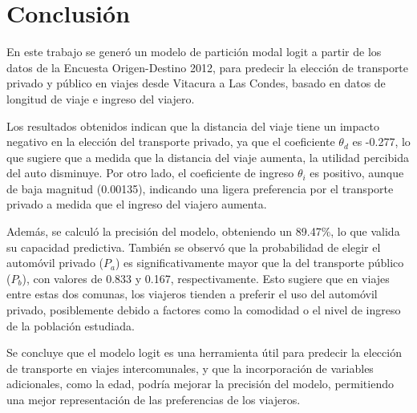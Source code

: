 \section{Conclusión}

En este trabajo se generó un modelo de partición modal logit a partir de los datos de la Encuesta Origen-Destino 2012, para predecir la elección de transporte privado y público en viajes desde Vitacura a Las Condes, basado en datos de longitud de viaje e ingreso del viajero.

Los resultados obtenidos indican que la distancia del viaje tiene un impacto negativo en la elección del transporte privado, ya que el coeficiente $\theta_d$ es -0.277, lo que sugiere que a medida que la distancia del viaje aumenta, la utilidad percibida del auto disminuye. Por otro lado, el coeficiente de ingreso $\theta_i$ es positivo, aunque de baja magnitud (0.00135), indicando una ligera preferencia por el transporte privado a medida que el ingreso del viajero aumenta.

Además, se calculó la precisión del modelo, obteniendo un 89.47\%, lo que valida su capacidad predictiva. También se observó que la probabilidad de elegir el automóvil privado ($P_a$) es significativamente mayor que la del transporte público ($P_b$), con valores de 0.833 y 0.167, respectivamente. Esto sugiere que en viajes entre estas dos comunas, los viajeros tienden a preferir el uso del automóvil privado, posiblemente debido a factores como la comodidad o el nivel de ingreso de la población estudiada.

Se concluye que el modelo logit es una herramienta útil para predecir la elección de transporte en viajes intercomunales, y que la incorporación de variables adicionales, como la edad, podría mejorar la precisión del modelo, permitiendo una mejor representación de las preferencias de los viajeros.

